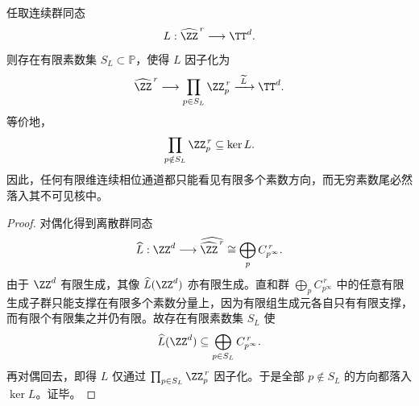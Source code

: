 \begin{theorem}[有限维连续相位通道对无穷素数尾的结构性失明]\label{thm:conclusion-boundary-prime-tail-blindness}
任取连续群同态
\[
L:\widehat{\ZZ}^{\,r}\longrightarrow \TT^d.
\]
则存在有限素数集 \(S_L\subset \mathbb P\)，使得 \(L\) 因子化为
\[
\widehat{\ZZ}^{\,r}\longrightarrow \prod_{p\in S_L}\ZZ_p^{\,r}\xrightarrow{\ \widetilde L\ }\TT^d.
\]
等价地，
\[
\prod_{p\notin S_L}\ZZ_p^{\,r}\subseteq \ker L.
\]
因此，任何有限维连续相位通道都只能看见有限多个素数方向，而无穷素数尾必然落入其不可见核中。
\end{theorem}
\begin{proof}
对偶化得到离散群同态
\[
\widehat L:\ZZ^d\longrightarrow \widehat{\widehat{\ZZ}^{\,r}}
\cong
\bigoplus_p C_{p^\infty}^{\,r}.
\]
由于 \(\ZZ^d\) 有限生成，其像 \(\widehat L(\ZZ^d)\) 亦有限生成。直和群
\(
\bigoplus_p C_{p^\infty}^{\,r}
\)
中的任意有限生成子群只能支撑在有限多个素数分量上，因为有限组生成元各自只有有限支撑，而有限个有限集之并仍有限。故存在有限素数集 \(S_L\) 使
\[
\widehat L(\ZZ^d)\subseteq \bigoplus_{p\in S_L}C_{p^\infty}^{\,r}.
\]
再对偶回去，即得 \(L\) 仅通过 \(\prod_{p\in S_L}\ZZ_p^{\,r}\) 因子化。于是全部 \(p\notin S_L\) 的方向都落入 \(\ker L\)。证毕。
\end{proof}

